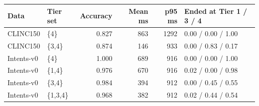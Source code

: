 \begin{tabular}{llrrrl}
\toprule
Data & Tier set & Accuracy & Mean ms & p95 ms & Ended at Tier 1 / 3 / 4 \\
\midrule
CLINC150 & \{4\} & 0.827 & 863 & 1292 & 0.00 / 0.00 / 1.00 \\
CLINC150 & \{3,4\} & 0.874 & 146 & 933 & 0.00 / 0.83 / 0.17 \\
Intents-v0 & \{4\} & 1.000 & 689 & 916 & 0.00 / 0.00 / 1.00 \\
Intents-v0 & \{1,4\} & 0.976 & 670 & 916 & 0.02 / 0.00 / 0.98 \\
Intents-v0 & \{3,4\} & 0.984 & 394 & 912 & 0.00 / 0.45 / 0.55 \\
Intents-v0 & \{1,3,4\} & 0.968 & 382 & 912 & 0.02 / 0.44 / 0.54 \\
\bottomrule
\end{tabular}
